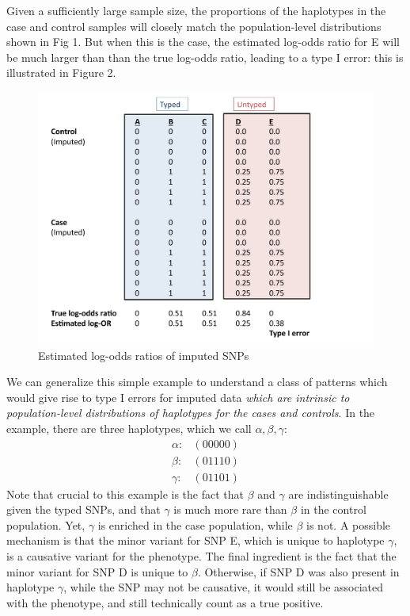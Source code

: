 \documentclass[12pt]{article}
\begin{document}
Given a sufficiently large sample size,
the proportions of the haplotypes in the case and control samples
will closely match the population-level distributions shown in Fig 1.
But when this is the case, the estimated log-odds ratio for E will be much
larger than than the true log-odds ratio, leading to a type I error:
this is illustrated in Figure 2.

\begin{figure}[h]
\centering
\includegraphics[scale=0.5]{impute_fig2.pdf}
\caption{Estimated log-odds ratios of imputed SNPs}
\end{figure}

We can generalize this simple example to understand
a class of patterns which would give rise to type I errors
for imputed data
\emph{which are intrinsic to population-level
distributions of haplotypes for the cases and controls}.
In the example, there are three haplotypes, which we call
$\alpha,\beta,\gamma$:
\begin{align*}
\alpha : & (00000)\\
\beta : & (01110)\\
\gamma : & (01101)
\end{align*}
Note that crucial to this example is the fact that $\beta$
and $\gamma$ are indistinguishable given the typed SNPs,
and that $\gamma$ is much more rare than $\beta$
in the control population.
Yet, $\gamma$ is enriched in the case population,
while $\beta$ is not.
A possible mechanism is that the minor variant for SNP E,
which is unique to haplotype $\gamma$,
is a causative variant for the phenotype.
The final ingredient is the fact that the minor variant for SNP D
is unique to $\beta$.
Otherwise, if SNP D was also present in haplotype $\gamma$,
while the SNP may not be causative, it would still be associated
with the phenotype, and still technically count as a true positive.
\end{document}
